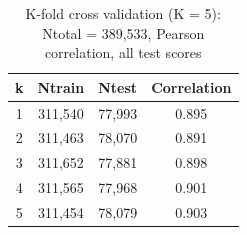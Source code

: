 \begin{table}
\caption{K-fold cross validation (K = 5): Ntotal = 389,533, Pearson correlation, all test scores}
\begin{center}
\begin{tabular}{ |c|c|c|c| } 
\hline
\textbf{k} & \textbf{Ntrain} & \textbf{Ntest} & \textbf{Correlation} \\
\hline
1 & 311,540 & 77,993 & 0.895 \\
\hline
2 & 311,463 & 78,070 & 0.891 \\
\hline
3 & 311,652 & 77,881 & 0.898 \\
\hline
4 & 311,565 & 77,968 & 0.901 \\
\hline
5 & 311,454 & 78,079 & 0.903 \\
\hline
\end{tabular}
\end{center}
\label{table:ba_cmp_xval}
\end{table}


